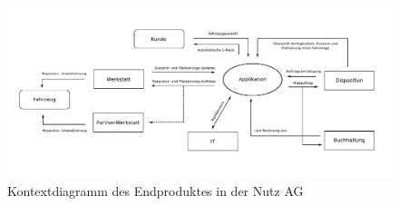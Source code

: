   \begin{figure}
    \centering
    \includegraphics[width=20.5cm,angle=-90]{aufgabe1/graphics/kontextdiagramm.pdf}
    \caption{Kontextdiagramm des Endproduktes in der Nutz AG}
    \label{fig:awesome_image}
  \end{figure}
